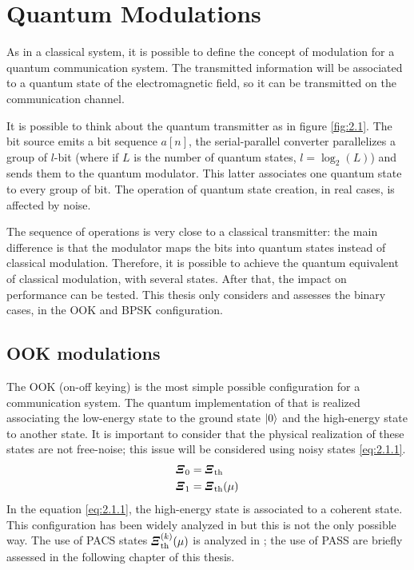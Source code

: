 \section{Quantum Modulations}
    As in a classical system, it is possible to define the concept of modulation for a 
    quantum communication system. The transmitted information will be associated to a 
    quantum state of the electromagnetic field, so it can be transmitted on the communication 
    channel.

    It is possible to think about the quantum transmitter as in figure \ref{fig:2.1}. The bit source
    emits a bit sequence $a[n]$, the serial-parallel converter parallelizes a group of $l$-bit (where
    if $L$ is the number of quantum states, $l=\log_2(L)$) and sends them to the quantum modulator.
    This latter associates one quantum state to every group of bit. The operation of quantum state 
    creation, in real cases, is affected by noise.

    The sequence of operations is very close to a classical transmitter: the main difference is that
    the modulator maps the bits into quantum states instead of classical modulation. Therefore, it is 
    possible to achieve the quantum equivalent of classical modulation, with several states. After 
    that, the impact on performance can be tested.
    This thesis only considers and assesses the binary cases, in the OOK and BPSK 
    configuration.
    
    \subsection{OOK modulations}
        The OOK (on-off keying) is the most simple possible configuration for a communication system.
        The quantum implementation of that is realized associating the low-energy state to the 
        ground state $\ket{0}$ and the high-energy state to another state. It is important to
        consider that the physical realization of these states are not free-noise; this issue will be
        considered using noisy states \ref{eq:2.1.1}.
        \begin{equation}\begin{split}
            \Operator{\varXi}_0 &= \Operator{\varXi}_{\mathrm{th}}\\
            \Operator{\varXi}_1 &= \Operator{\varXi}_{\mathrm{th}}(\mu)
            \label{eq:2.1.1}
        \end{split}\end{equation}
        In the equation \ref{eq:2.1.1}, the high-energy state is associated to a coherent state. This 
        configuration has been widely analyzed in \cite{helstrom1,helstrom2,coherentComm1,coherentComm2,
        coherentComm3,coherentComm4} but this is not the only possible way. The use of PACS states 
        $\Operator{\varXi}_{\mathrm{th}}^{(k)}(\mu)$ is analyzed in \cite{PACSDisc,tesiGuerrini}; the use of PASS are briefly
        assessed in the following chapter of this thesis.

